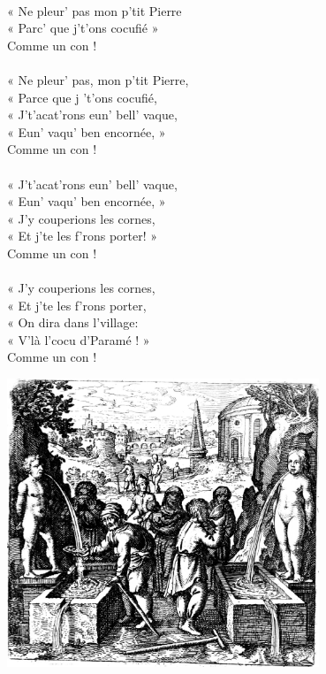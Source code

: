 \\« Ne pleur' pas mon p'tit Pierre
\\« Parc' que j't'ons cocufié »
\\Comme un con !
\\\\« Ne pleur' pas, mon p'tit Pierre,
\\« Parce que j 't'ons cocufié,
\\« J't'acat'rons eun' bell' vaque,
\\« Eun' vaqu' ben encornée, »
\\Comme un con !
\\\\« J't'acat'rons eun' bell' vaque,
\\« Eun' vaqu' ben encornée, »
\\« J'y couperions les cornes,
\\« Et j'te les f'rons porter! »
\\Comme un con !
\\\\« J'y couperions les cornes,
\\« Et j'te les f'rons porter,
\\« On dira dans l'village:
\\« V'là l'cocu d'Paramé ! »
\\Comme un con ! 
\bigskip
\begin{center}
   \includegraphics[width=0.7\textwidth]{images/brev42.png}
 \end{center}
 
\breakpage